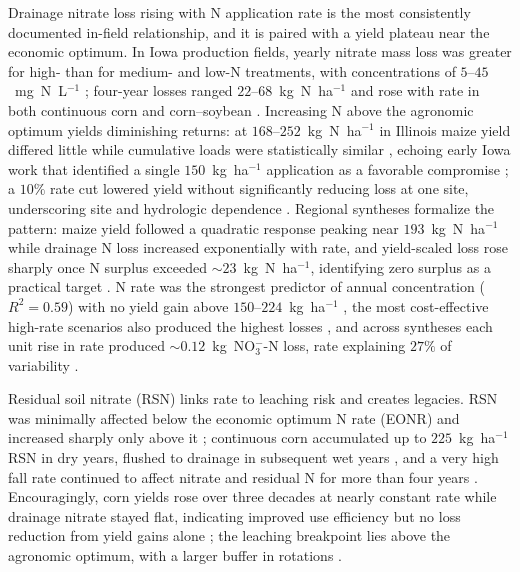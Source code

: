 Drainage nitrate loss rising with N application rate is the most consistently
documented in-field relationship, and it is paired with a yield plateau near
the economic optimum. In Iowa production fields, yearly nitrate mass loss was
greater for high- than for medium- and low-N treatments, with concentrations
of $5$--$45$~mg~N~L$^{-1}$ \parencite{Jaynes2001}; four-year losses ranged
$22$--$68$~kg~N~ha$^{-1}$ and rose with rate in both continuous corn and
corn--soybean \parencite{Helmers2012b}. Increasing N above the agronomic
optimum yields diminishing returns: at $168$--$252$~kg~N~ha$^{-1}$ in
Illinois maize yield differed little while cumulative loads were
statistically similar \parencite{Li2023b}, echoing early Iowa work that
identified a single $150$~kg~ha$^{-1}$ application as a favorable compromise
\parencite{Azevedo1997}; a $10\%$ rate cut lowered yield without significantly
reducing loss at one site, underscoring site and hydrologic dependence
\parencite{Gentry2024}. Regional syntheses formalize the pattern: maize yield
followed a quadratic response peaking near $193$~kg~N~ha$^{-1}$ while drainage
N loss increased exponentially with rate, and yield-scaled loss rose sharply
once N surplus exceeded $\sim23$~kg~N~ha$^{-1}$, identifying zero surplus as a
practical target \parencite{Zhao2016}. N rate was the strongest predictor of
annual concentration ($R^2=0.59$) with no yield gain above
$150$--$224$~kg~ha$^{-1}$ \parencite{Hertzberger2019}, the most cost-effective
high-rate scenarios also produced the highest losses \parencite{Liu2021}, and
across syntheses each unit rise in rate produced $\sim0.12$~kg~NO$_3^-$-N
loss, rate explaining $27\%$ of variability
\parencite{Chatterjee2020b,Christianson2015b,Ritter2015}.

Residual soil nitrate (RSN) links rate to leaching risk and creates
legacies. RSN was minimally affected below the economic optimum N rate (EONR)
and increased sharply only above it \parencite{Bandura2025}; continuous corn
accumulated up to $225$~kg~ha$^{-1}$ RSN in dry years, flushed to drainage in
subsequent wet years \parencite{Randall2001}, and a very high fall rate
continued to affect nitrate and residual N for more than four years
\parencite{Jaynes2015}. Encouragingly, corn yields rose over three decades at
nearly constant rate while drainage nitrate stayed flat, indicating improved
use efficiency but no loss reduction from yield gains alone
\parencite{Clifford2023}; the leaching breakpoint lies above the agronomic
optimum, with a larger buffer in rotations \parencite{Pasley2021}.

